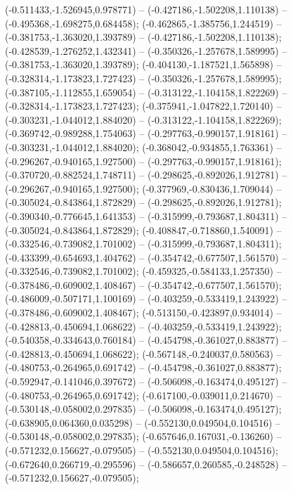  (-0.511433,-1.526945,0.978771) -- (-0.427186,-1.502208,1.110138) -- (-0.495368,-1.698275,0.684458);
 (-0.462865,-1.385756,1.244519) -- (-0.381753,-1.363020,1.393789) -- (-0.427186,-1.502208,1.110138);
 (-0.428539,-1.276252,1.432341) -- (-0.350326,-1.257678,1.589995) -- (-0.381753,-1.363020,1.393789);
 (-0.404130,-1.187521,1.565898) -- (-0.328314,-1.173823,1.727423) -- (-0.350326,-1.257678,1.589995);
 (-0.387105,-1.112855,1.659054) -- (-0.313122,-1.104158,1.822269) -- (-0.328314,-1.173823,1.727423);
 (-0.375941,-1.047822,1.720140) -- (-0.303231,-1.044012,1.884020) -- (-0.313122,-1.104158,1.822269);
 (-0.369742,-0.989288,1.754063) -- (-0.297763,-0.990157,1.918161) -- (-0.303231,-1.044012,1.884020);
 (-0.368042,-0.934855,1.763361) -- (-0.296267,-0.940165,1.927500) -- (-0.297763,-0.990157,1.918161);
 (-0.370720,-0.882524,1.748711) -- (-0.298625,-0.892026,1.912781) -- (-0.296267,-0.940165,1.927500);
 (-0.377969,-0.830436,1.709044) -- (-0.305024,-0.843864,1.872829) -- (-0.298625,-0.892026,1.912781);
 (-0.390340,-0.776645,1.641353) -- (-0.315999,-0.793687,1.804311) -- (-0.305024,-0.843864,1.872829);
 (-0.408847,-0.718860,1.540091) -- (-0.332546,-0.739082,1.701002) -- (-0.315999,-0.793687,1.804311);
 (-0.433399,-0.654693,1.404762) -- (-0.354742,-0.677507,1.561570) -- (-0.332546,-0.739082,1.701002);
 (-0.459325,-0.584133,1.257350) -- (-0.378486,-0.609002,1.408467) -- (-0.354742,-0.677507,1.561570);
 (-0.486009,-0.507171,1.100169) -- (-0.403259,-0.533419,1.243922) -- (-0.378486,-0.609002,1.408467);
 (-0.513150,-0.423897,0.934014) -- (-0.428813,-0.450694,1.068622) -- (-0.403259,-0.533419,1.243922);
 (-0.540358,-0.334643,0.760184) -- (-0.454798,-0.361027,0.883877) -- (-0.428813,-0.450694,1.068622);
 (-0.567148,-0.240037,0.580563) -- (-0.480753,-0.264965,0.691742) -- (-0.454798,-0.361027,0.883877);
 (-0.592947,-0.141046,0.397672) -- (-0.506098,-0.163474,0.495127) -- (-0.480753,-0.264965,0.691742);
 (-0.617100,-0.039011,0.214670) -- (-0.530148,-0.058002,0.297835) -- (-0.506098,-0.163474,0.495127);
 (-0.638905,0.064360,0.035298) -- (-0.552130,0.049504,0.104516) -- (-0.530148,-0.058002,0.297835);
 (-0.657646,0.167031,-0.136260) -- (-0.571232,0.156627,-0.079505) -- (-0.552130,0.049504,0.104516);
 (-0.672640,0.266719,-0.295596) -- (-0.586657,0.260585,-0.248528) -- (-0.571232,0.156627,-0.079505);

